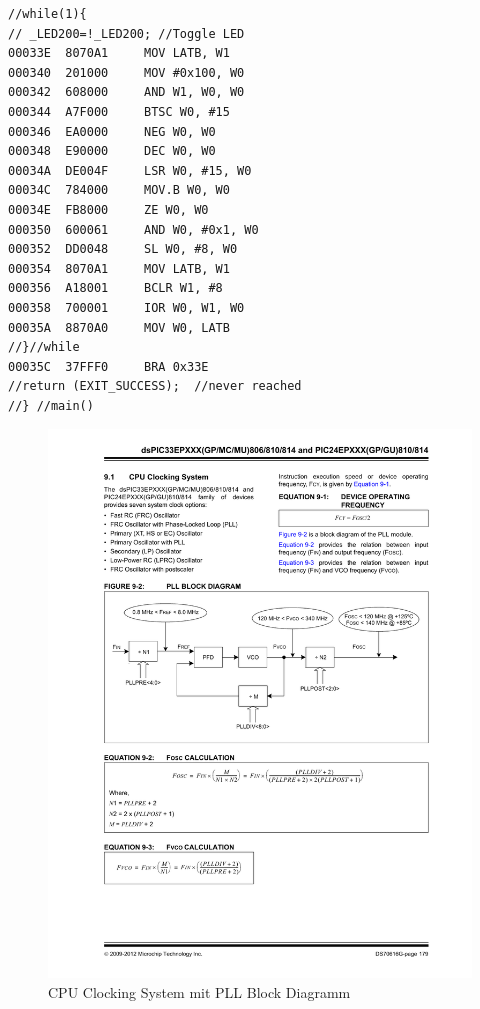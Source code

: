 \begin{lstlisting}[frame=htrbl, caption={Assembler Befehle zum toggeln}, label={lst:AssemblerToggle}]
//while(1){
// _LED200=!_LED200; //Toggle LED
00033E  8070A1     MOV LATB, W1
000340  201000     MOV #0x100, W0
000342  608000     AND W1, W0, W0
000344  A7F000     BTSC W0, #15
000346  EA0000     NEG W0, W0
000348  E90000     DEC W0, W0
00034A  DE004F     LSR W0, #15, W0
00034C  784000     MOV.B W0, W0
00034E  FB8000     ZE W0, W0
000350  600061     AND W0, #0x1, W0
000352  DD0048     SL W0, #8, W0
000354  8070A1     MOV LATB, W1
000356  A18001     BCLR W1, #8
000358  700001     IOR W0, W1, W0
00035A  8870A0     MOV W0, LATB
//}//while
00035C  37FFF0     BRA 0x33E
//return (EXIT_SUCCESS);  //never reached
//} //main()
\end{lstlisting}	
\newpage

\begin{figure}
	\centering
	\includegraphics[width=\textwidth]{Images/CPUClockingSystem}
	\caption[CPU Blocking System]{CPU Clocking System mit PLL Block Diagramm}
	\label{image:CPUClockingSystem}
\end{figure}

